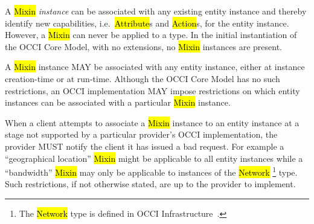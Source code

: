 \documentclass[10pt,a4paper]{article}
\begin{document}
A \hl{Mixin} {\em instance} can be associated with any existing
entity instance and thereby identify new capabilities,
i.e.~\hl{Attribute}s and \hl{Action}s, for the entity instance.
However, a
\hl{Mixin} can never be applied to a type.  In the initial
instantiation of the OCCI Core Model, with no extensions, no
\hl{Mixin} instances are present.

A \hl{Mixin} instance MAY be associated with any entity instance,
either at instance creation-time or at run-time. Although the OCCI
Core Model has no such restrictions, an OCCI implementation MAY impose
restrictions on which entity instances can be associated with a
particular \hl{Mixin} instance.

When a client attempts to associate a \hl{Mixin} instance to an entity instance
at a stage not supported by a particular provider's OCCI
implementation, the provider MUST notify the client it has issued a
bad request.
%
For example a ``geographical location'' \hl{Mixin} might be applicable
to all entity instances while a ``bandwidth'' \hl{Mixin} may only
be applicable to instances of the \hl{Network}%
\footnote{The \hl{Network} type is defined in OCCI
  Infrastructure~\cite{occi:infrastructure}.}  type. Such
restrictions, if not otherwise stated, are up to the provider to
implement.

\end{document}

